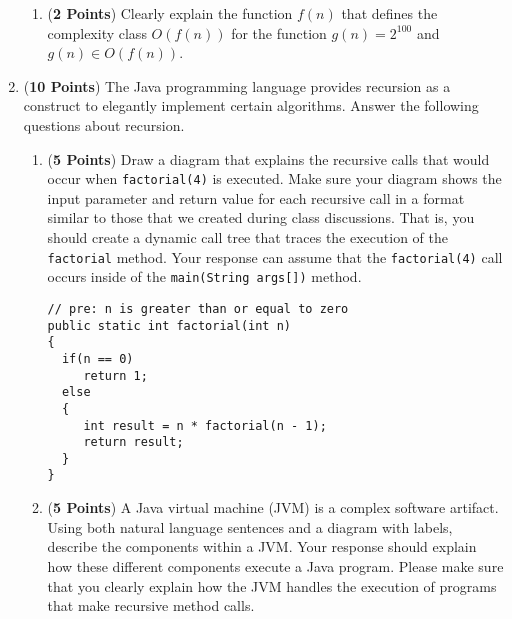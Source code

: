 \documentclass[12pt]{article}
\begin{document}
\begin{enumerate}
\begin{enumerate}
\item ({\bf 2 Points}) Clearly explain the function $f(n)$ that
  defines the complexity class $O(f(n))$ for the function $g(n) =
  2^{100}$ and $g(n) \in O(f(n))$.
  
\end{enumerate}

\newpage

\item ({\bf 10 Points}) The Java programming language provides recursion
  as a construct to elegantly implement certain algorithms.  Answer the 
  following questions about recursion.

\begin{enumerate}

\item ({\bf 5 Points}) Draw a diagram that explains the recursive
  calls that would occur when {\tt factorial(4)} is executed.  Make
  sure your diagram shows the input parameter and return value for
  each recursive call in a format similar to those that we created
  during class discussions.  That is, you should create a dynamic call
  tree that traces the execution of the {\tt factorial} method. Your
  response can assume that the {\tt factorial(4)} call occurs inside
  of the {\tt main(String args[])} method.

{\small 
\begin{verbatim}
// pre: n is greater than or equal to zero
public static int factorial(int n)
{
  if(n == 0)
     return 1;
  else
  {
     int result = n * factorial(n - 1);
     return result;
  }
} 
\end{verbatim}
}


\item ({\bf 5 Points}) A Java virtual machine (JVM) is a complex software artifact.  Using both natural language
  sentences and a diagram with labels, describe the components within a JVM.  Your response should explain how these
  different components execute a Java program.  Please make sure that you clearly explain how the JVM handles the
  execution of programs that make recursive method calls.



\end{enumerate}
\end{enumerate}
\end{document}
